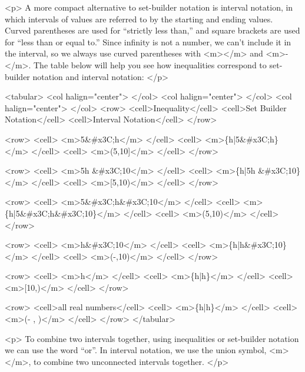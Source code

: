         <p>
            A more compact alternative to set-builder notation is interval notation, in which intervals of values are referred to by the starting and ending values.
            Curved parentheses are used for “strictly less than,” and square brackets are used for “less than or equal to.” Since infinity is not a number, we can’t include it in the interval, so we always use curved parentheses with <m>\infty</m> and <m>-\infty</m>.
            The table below will help you see how inequalities correspond to set-builder notation and interval notation:
        </p>

        <tabular>
            <col halign="center"> </col> <col halign="center"> </col> <col halign="center"> </col>
            <row>
                <cell>Inequality</cell>
                <cell>Set Builder Notation</cell>
                <cell>Interval Notation</cell>
            </row>

            <row>
                <cell> <m>5&#x3C;h</m> </cell>
                <cell> <m>\{h|5&#x3C;h\}</m> </cell>
                <cell> <m>(5,10]</m> </cell>
            </row>

            <row>
                <cell> <m>5\leq h &#x3C;10</m> </cell>
                <cell> <m>\{h|5\leq h &#x3C;10\}</m> </cell>
                <cell> <m>[5,10)</m> </cell>
            </row>

            <row>
                <cell> <m>5&#x3C;h&#x3C;10</m> </cell>
                <cell> <m>\{h|5&#x3C;h&#x3C;10\}</m> </cell>
                <cell> <m>(5,10)</m> </cell>
            </row>

            <row>
                <cell> <m>h&#x3C;10</m> </cell>
                <cell> <m>\{h|h&#x3C;10\}</m> </cell>
                <cell> <m>(-\infty,10)</m> </cell>
            </row>

            <row>
                <cell> <m>h</m> </cell>
                <cell> <m>\{h|h\}</m> </cell>
                <cell> <m>[10,\infty)</m> </cell>
            </row>

            <row>
                <cell>all real numbers</cell>
                <cell> <m>\{h|h\in{}\}</m> </cell>
                <cell> <m>(- \infty, \infty)</m> </cell>
            </row>
        </tabular>

        <p>
            To combine two intervals together, using inequalities or set-builder notation we can use the word “or”.
            In interval notation, we use the union symbol, <m>\cup</m>, to combine two unconnected intervals together.
        </p>

